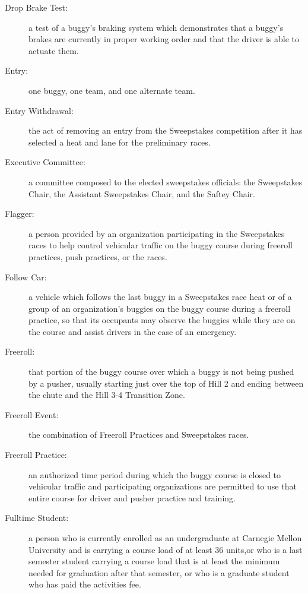 \begin{description}
	\item[Drop Brake Test:]
	a test of a buggy's braking system which demonstrates that a buggy's brakes
	are currently in proper working order and that the driver is able to actuate
	them.

	\item[Entry:]
	one buggy, one team, and one alternate team.

	\item[Entry Withdrawal:]
	the act of removing an entry from the Sweepstakes competition after it has
	selected a heat and lane for the preliminary races.

	\item[Executive Committee:]
	a committee composed to the elected sweepstakes officials: the Sweepstakes
	Chair, the Assistant Sweepstakes Chair, and the Saftey Chair.

	\item[Flagger:]
	a person provided by an organization participating in the Sweepstakes races
	to help control vehicular traffic on the buggy course during freeroll
	practices, push practices, or the races.

	\item[Follow Car:]
	a vehicle which follows the last buggy in a Sweepstakes race heat or of a
	group of an organization's buggies on the buggy course during a freeroll
	practice, so that its occupants may observe the buggies while they are on the
	course and assist drivers in the case of an emergency.

	\item[Freeroll:]
	that portion of the buggy course over which a buggy is not being pushed by
	a pusher, usually starting just over the top of Hill 2 and ending between the
	chute and the Hill 3-4 Transition Zone.

	\item[Freeroll Event:]
	the combination of Freeroll Practices and Sweepstakes races.

	\item[Freeroll Practice:]
	an authorized time period during which the buggy course is closed to
	vehicular traffic and participating organizations are permitted to use that
	entire course for driver and pusher practice and training.

	\item[Fulltime Student:]
	a person who is currently enrolled as an undergraduate at Carnegie Mellon
	University and is carrying a course load of at least 36 units,or who is a last
	semester student carrying a course load that is at least the minimum needed for
	graduation after that semester, or who is a graduate student who has paid the
	activities fee.


\end{description}

